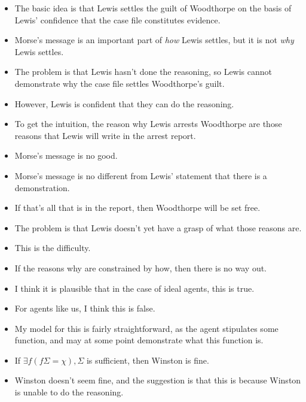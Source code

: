\documentclass[10pt]{article}
\newcommand{\hozlinedash}[0]{%
  \noindent\hdashrule[0.5ex][c]{\textwidth}{.1pt}{2.5pt}
}
\begin{document}
\begin{itemize}
\item The basic idea is that Lewis settles the guilt of Woodthorpe on the basis of Lewis' confidence that the case file constitutes evidence.
\item Morse's message is an important part of \emph{how} Lewis settles, but it is not \emph{why} Lewis settles.
\end{itemize}

\begin{itemize}
\item The problem is that Lewis hasn't done the reasoning, so Lewis cannot demonstrate why the case file settles Woodthorpe's guilt.
\item However, Lewis is confident that they can do the reasoning.
\end{itemize}

\begin{itemize}
\item To get the intuition, the reason why Lewis arrests Woodthorpe are those reasons that Lewis will write in the arrest report.
\item Morse's message is no good.
\item Morse's message is no different from Lewis' statement that there is a demonstration.
\item If that's all that is in the report, then Woodthorpe will be set free.
\item The problem is that Lewis doesn't yet have a grasp of what those reasons are.
\item This is the difficulty.
\item If the reasons why are constrained by how, then there is no way out.
\item I think it is plausible that in the case of ideal agents, this is true.
\item For agents like us, I think this is false.
\end{itemize}

\begin{itemize}
\item My model for this is fairly straightforward, as the agent stipulates some function, and may at some point demonstrate what this function is.
\end{itemize}

\hozlinedash

\begin{itemize}
\item If \(\exists f(f\Sigma = \chi), \Sigma\) is sufficient, then Winston is fine.
\item Winston doesn't seem fine, and the suggestion is that this is because Winston is unable to do the reasoning.
\end{itemize}
\end{document}
